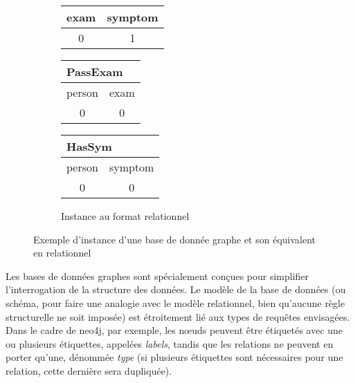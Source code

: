 \begin{figure}[p]
\begin{minipage}[][\textheight][c]{\textwidth}
\begin{subfigure}{\linewidth}
\begin{adjustbox}{varwidth=\linewidth, max height=.2\textheight}
\begin{tabular}[t]{c|c}
                    \hline
                    \hline
                    exam & symptom                        \\
                    \hline
                    0    & 1                              \\
                \end{tabular}
                \quad\hfill
                \begin{tabular}[t]{c|c}
                    \multicolumn{2}{l}{\textbf{PassExam}} \\
                    \hline
                    \hline
                    person & exam                         \\
                    \hline
                    0      & 0                            \\
                \end{tabular}
                \quad\hfill
                \begin{tabular}[t]{c|c}
                    \multicolumn{2}{l}{\textbf{HasSym}} \\
                    \hline
                    \hline
                    person & symptom                    \\
                    \hline
                    0      & 0                          \\
                \end{tabular}
            \end{adjustbox}
            \caption{Instance au format relationnel}
        \end{subfigure}
        \caption{Exemple d'instance d'une base de donnée graphe et son équivalent en relationnel}
        \label{fig:update:pre:graph}
    \end{minipage}
\end{figure}

Les bases de données graphes sont spécialement conçues pour simplifier l'interrogation de la structure des données.
Le modèle de la base de données (ou schéma, pour faire une analogie avec le modèle relationnel, bien qu'aucune règle structurelle ne soit imposée) est étroitement lié aux types de requêtes envisagées.
Dans le cadre de \gls{neo4j}, par exemple, les nœuds peuvent être étiquetés avec une ou plusieurs étiquettes, appelées \emph{labels}, tandis que les relations ne peuvent en porter qu'une, dénommée \emph{type} (si plusieurs étiquettes sont nécessaires pour une relation, cette dernière sera dupliquée).

